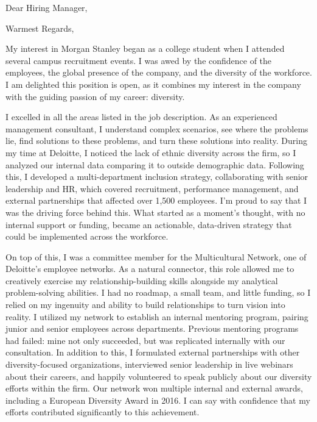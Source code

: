 \documentclass[11pt,a4paper,sans]{moderncv}        %
\newcommand{\CompanyName}{Morgan Stanley}
\newcommand{\Street}{1585 Broadway}
\newcommand{\City}{New York}
\newcommand{\State}{NY}
\begin{document}
\recipient{\CompanyName}{\Street\\\City, \State}
\date{\today}
\opening{Dear Hiring Manager,}
\closing{Warmest Regards,}
\makelettertitle

My interest in \CompanyName{} began as a college student when I attended several
campus recruitment events. I was awed by the confidence of the employees, the
global presence of the company, and the diversity of the workforce. I am
delighted this position is open, as it combines my interest in the company
with the guiding passion of my career: diversity. 
 
I excelled in all the areas listed in the job description. As an
experienced management consultant, I understand complex scenarios, see where
the problems lie, find solutions to these problems, and turn these solutions
into reality. During my time at Deloitte, I noticed the lack of ethnic
diversity across the firm, so I analyzed our internal data comparing it to
outside demographic data. Following this, I developed a multi-department
inclusion strategy, collaborating with senior leadership and HR, which covered
recruitment, performance management, and external partnerships that affected
over 1,500 employees. I'm proud to say that I was the driving force behind
this. What started as a moment's thought, with no internal support or funding,
became an actionable, data-driven strategy that could be implemented across the
workforce.

On top of this, I was a committee member for the Multicultural Network, one of
Deloitte's employee networks. As a natural connector, this role allowed me to
creatively exercise my relationship-building skills alongside my analytical
problem-solving abilities. I had no roadmap, a small team, and little funding,
so I relied on my ingenuity and ability to build relationships to turn vision
into reality. I utilized my network to establish an internal mentoring program,
pairing junior and senior employees across departments. Previous mentoring
programs had failed: mine not only succeeded, but was replicated internally
with our consultation. In addition to this, I formulated external partnerships
with other diversity-focused organizations, interviewed senior leadership in
live webinars about their careers, and happily volunteered to speak publicly
about our diversity efforts within the firm. Our network won multiple internal
and external awards, including a European Diversity Award in 2016. I can say
with confidence that my efforts contributed significantly to this achievement.
\end{document}
